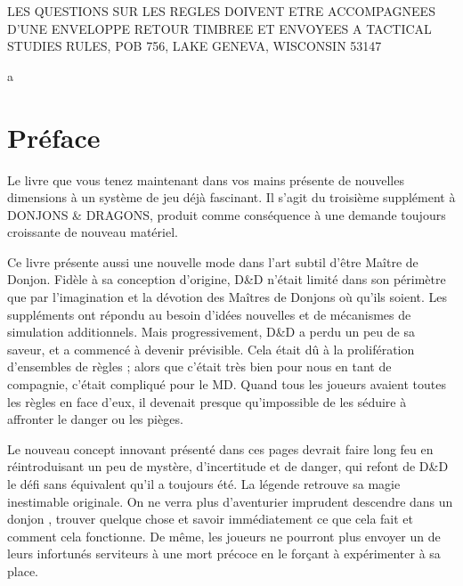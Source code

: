 \documentclass[11pt]{article}
\begin{document}
{\small \noindent LES QUESTIONS SUR LES REGLES DOIVENT ETRE ACCOMPAGNEES D'UNE ENVELOPPE RETOUR TIMBREE ET ENVOYEES A TACTICAL STUDIES RULES, POB 756, LAKE GENEVA, WISCONSIN 53147}


\newpage
{\color{white}a}

\vfill


\newpage

\section*{Préface}

Le livre que vous tenez maintenant dans vos mains présente de nouvelles dimensions à un système de jeu déjà fascinant. Il s'agit du troisième supplément à DONJONS \& DRAGONS, produit comme conséquence à une demande toujours croissante de nouveau matériel.

Ce livre présente aussi une nouvelle mode dans l'art subtil d'être Maître de Donjon. Fidèle à sa conception d'origine, D\&D n'était limité dans son périmètre que par l'imagination et la dévotion des Maîtres de Donjons où qu'ils soient. Les suppléments ont répondu au besoin d'idées nouvelles et de mécanismes de simulation additionnels. Mais progressivement, D\&D a perdu un peu de sa saveur, et a commencé à devenir prévisible. Cela était dû à la prolifération d'ensembles de règles ; alors que c'était très bien pour nous en tant de compagnie, c'était compliqué pour le MD. Quand tous les joueurs avaient toutes les règles en face d'eux, il devenait presque qu'impossible de les séduire à affronter le danger ou les pièges.

Le nouveau concept innovant présenté dans ces pages devrait faire long feu en réintroduisant un peu de mystère, d'incertitude et de danger, qui refont de D\&D le défi sans équivalent qu'il a toujours été. La légende retrouve sa magie inestimable originale. On ne verra plus d'aventurier imprudent descendre dans un donjon , trouver quelque chose et savoir immédiatement ce que cela fait et comment cela fonctionne. De même, les joueurs ne pourront plus envoyer un de leurs infortunés serviteurs à une mort précoce en le forçant à expérimenter à sa place.
\end{document}
